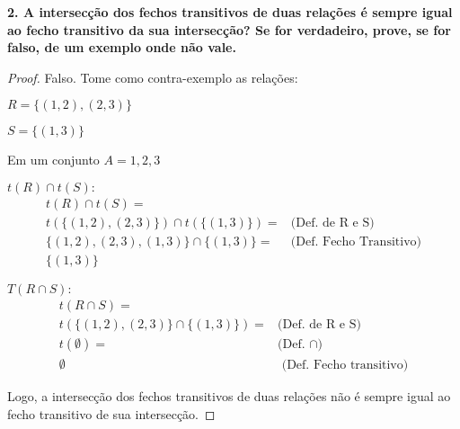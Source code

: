 \documentclass[12pt]{article}
\begin{document}
\textbf{2.  A intersecção dos fechos transitivos de duas relações é sempre igual ao fecho transitivo da
sua intersecção? Se for verdadeiro, prove, se for falso, de um exemplo onde não vale.}

\begin{proof}
Falso. Tome como contra-exemplo as relações:


$R = \{(1,2), (2,3)\}$


$S = \{(1,3)\}$


Em um conjunto $A = {1,2,3}$


$t(R) \cap t(S):$
\begin{align*}
t(R) \cap t(S) = 
\\ t(\{(1,2),(2,3)\}) \cap t(\{(1,3)\}) = 
&\text{(Def. de R e S)}\\ \{(1,2),(2,3),(1,3)\} \cap \{(1,3)\} = 
&\text{(Def. Fecho Transitivo)} \\ \{(1,3)\} 
\end{align*}

$T(R \cap S):$
\begin{align*}
t(R \cap S) = 
\\ t(\{(1,2),(2,3)\} \cap \{(1,3)\}) =
&\text{(Def. de R e S)}\\ t(\emptyset) = 
&\text{(Def. } \cap)\\ \emptyset
&\text{ (Def. Fecho transitivo)}\end{align*}



Logo, a intersecção dos fechos transitivos de duas relações não é sempre igual ao fecho transitivo de sua intersecção.
\end{proof}
\end{document}
